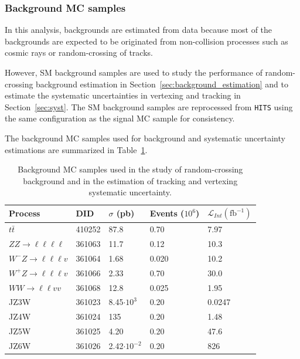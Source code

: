 \subsubsection{Background MC samples}
\label{sec:background_mc_sample}
In this analysis, backgrounds are estimated from data because most of the backgrounds are expected to be originated from non-collision processes such as cosmic rays or random-crossing of tracks. %

However, SM background samples are used to study the performance of random-crossing background estimation in Section~\ref{sec:background_estimation} and to estimate the systematic uncertainties in vertexing and tracking in Section~\ref{sec:syst}. The SM background samples are reprocessed from \texttt{HITS} using the same configuration as the signal MC sample for consistency.

The background MC samples used for background and systematic uncertainty estimations are summarized in Table~\ref{table:background_MC}.


\begin{table}[!htb]
  \centering
  \begin{tabular}{ l l l l l}
    \hline
    \hline
    Process         &   DID     &   $\sigma$ (pb)       & Events ($10^{6}$) &   $\mathcal{L}_{Int} (\mathrm{fb^{-1}})$ \\
    \hline
    $t\bar{t}$                              &   410252  &   87.8   &   0.70        &   7.97                 \\
    $ZZ\rightarrow \ell \ell \ell \ell$     &   361063  &   11.7   &   0.12        &   10.3                 \\
    $W^{-}Z\rightarrow \ell \ell \ell v$    &   361064  &   1.68   &   0.020       &   10.2                 \\
    $W^{+}Z\rightarrow \ell \ell \ell v$    &   361066  &   2.33   &   0.70        &   30.0                 \\
    $WW \rightarrow \ell \ell vv$           &   361068  &   12.8   &   0.025       &   1.95                 \\
    JZ3W                                    &   361023  &   8.45$\cdot10^{3}$      &   0.20  &   0.0247     \\
    JZ4W                                    &   361024  &   135    &   0.20        &   1.48                 \\
    JZ5W                                    &   361025  &   4.20   &   0.20        &   47.6                 \\
    JZ6W                                    &   361026  &   2.42$\cdot10^{-2}$     &   0.20  &   826        \\
    \hline
    \hline
  \end{tabular}
  \caption{Background MC samples used in the study of random-crossing background and in the estimation of tracking and vertexing systematic uncertainty.}
  \label{table:background_MC}
\end{table}
